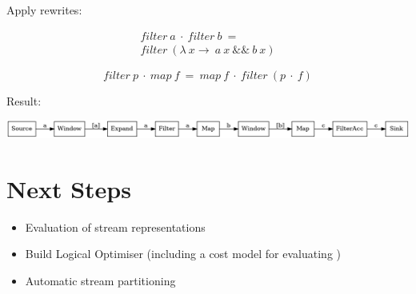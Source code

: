 \documentclass[a1paper,fleqn]{betterposter}
\begin{document}
{Apply rewrites:

\[
\begin{aligned}
filter\ a\ \cdot\ filter\ b\ =
\\    filter\ (\lambda\ x \rightarrow\ a\ x\ \&\&\ b\ x)
\end{aligned}
\]

\[
    filter\ p\ \cdot\ map\ f\ =\ map\ f\ \cdot\ filter\ (p\ \cdot\ f)
\] 

Result:

\begin{center}
\includegraphics[width=\textwidth]{img/after}
\end{center}

\section{Next Steps}

\begin{itemize}
    \item Evaluation of stream representations
    \item Build Logical Optimiser (including a cost model for evaluating )
    \item Automatic stream partitioning
\end{itemize}

\vfill
\author{jon.dowland@ncl.ac.uk}

}
\end{document}
